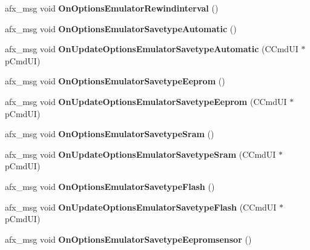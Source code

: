 \begin{DoxyCompactItemize}
\item 
\mbox{\label{class_main_wnd_aed243489fe737a76bfdabee4a0a1b8f8}} 
afx\+\_\+msg void {\bfseries On\+Options\+Emulator\+Rewindinterval} ()
\item 
\mbox{\label{class_main_wnd_a052e23f4c24c94b273a095d36e660fdd}} 
afx\+\_\+msg void {\bfseries On\+Options\+Emulator\+Savetype\+Automatic} ()
\item 
\mbox{\label{class_main_wnd_a5173da0c1314856915ce11a4c96fa69c}} 
afx\+\_\+msg void {\bfseries On\+Update\+Options\+Emulator\+Savetype\+Automatic} (C\+Cmd\+UI $\ast$p\+Cmd\+UI)
\item 
\mbox{\label{class_main_wnd_ab0b7f0078bb9327c33fa04501e971e57}} 
afx\+\_\+msg void {\bfseries On\+Options\+Emulator\+Savetype\+Eeprom} ()
\item 
\mbox{\label{class_main_wnd_ac10419115fc79d4d6cb8ff3c5bea5e36}} 
afx\+\_\+msg void {\bfseries On\+Update\+Options\+Emulator\+Savetype\+Eeprom} (C\+Cmd\+UI $\ast$p\+Cmd\+UI)
\item 
\mbox{\label{class_main_wnd_a3599dc0ef10dceab417ada2584cb18e6}} 
afx\+\_\+msg void {\bfseries On\+Options\+Emulator\+Savetype\+Sram} ()
\item 
\mbox{\label{class_main_wnd_a8ad77ce8b5d29f009b9086f708ae2aba}} 
afx\+\_\+msg void {\bfseries On\+Update\+Options\+Emulator\+Savetype\+Sram} (C\+Cmd\+UI $\ast$p\+Cmd\+UI)
\item 
\mbox{\label{class_main_wnd_aa52cbad3383a4f2d0f05f4c8e2e5f556}} 
afx\+\_\+msg void {\bfseries On\+Options\+Emulator\+Savetype\+Flash} ()
\item 
\mbox{\label{class_main_wnd_a70b80fcf494b4d70c006956144170803}} 
afx\+\_\+msg void {\bfseries On\+Update\+Options\+Emulator\+Savetype\+Flash} (C\+Cmd\+UI $\ast$p\+Cmd\+UI)
\item 
\mbox{\label{class_main_wnd_ac623d029d6d33c1c8e22fbb671725558}} 
afx\+\_\+msg void {\bfseries On\+Options\+Emulator\+Savetype\+Eepromsensor} ()

\end{DoxyCompactItemize}
